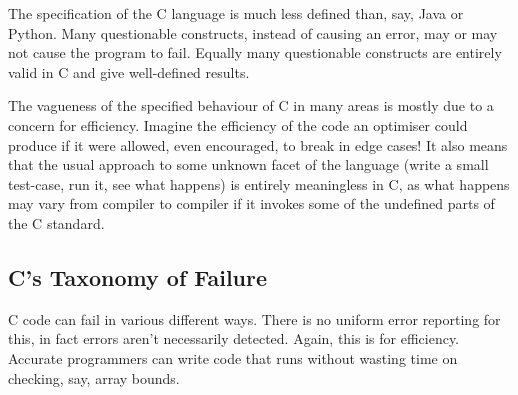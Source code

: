 \documentclass[a4paper]{report}
\begin{document}
The specification of the C language is much less defined than, say, Java or Python. Many questionable constructs, instead of causing an error, may or may not cause the program to fail. Equally many questionable constructs are entirely valid in C and give well-defined results.

The vagueness of the specified behaviour of C in many areas is mostly due to a concern for efficiency. Imagine the efficiency of the code an optimiser could produce if it were allowed, even encouraged, to break in edge cases! It also means that the usual approach to some unknown facet of the language (write a small test-case, run it, see what happens) is entirely meaningless in C, as what happens may vary from compiler to compiler if it invokes some of the undefined parts of the C standard.

\subsection{C's Taxonomy of Failure}
C code can fail in various different ways. There is no uniform error reporting for this, in fact errors aren't necessarily detected. Again, this is for efficiency. Accurate programmers can write code that runs without wasting time on checking, say, array bounds.
\end{document}
